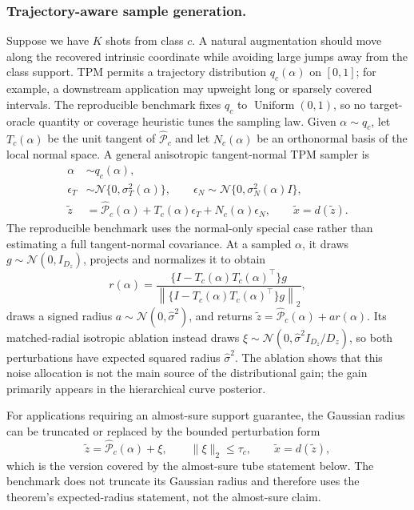 \documentclass[preprint,12pt,number]{elsarticle}
\begin{document}
\subsubsection{Trajectory-aware sample generation.} 
Suppose we have $K$ shots from class $c$. A natural augmentation should move along the recovered intrinsic coordinate while avoiding large jumps away from the class support. TPM permits a trajectory distribution $q_c(\alpha)$ on $[0,1]$; for example, a downstream application may upweight long or sparsely covered intervals. The reproducible benchmark fixes $q_c$ to $\operatorname{Uniform}(0,1)$, so no target-oracle quantity or coverage heuristic tunes the sampling law. Given $\alpha\sim q_c$, let $T_c(\alpha)$ be the unit tangent of $\widehat{\mathcal{P}}_c$ and let $N_c(\alpha)$ be an orthonormal basis of the local normal space. A general anisotropic tangent-normal TPM sampler is
\begin{align}
	\alpha &\sim q_c(\alpha), \nonumber\\
	\epsilon_T &\sim \mathcal{N}\{0,\sigma_T^2(\alpha)\}, \qquad
	\epsilon_N \sim \mathcal{N}\{0,\sigma_N^2(\alpha)I\}, \nonumber\\
	\tilde z
	&=
	\widehat{\mathcal{P}}_c(\alpha)
	+
	T_c(\alpha)\epsilon_T
	+
	N_c(\alpha)\epsilon_N,
	\qquad
	\tilde x=d(\tilde z).
	\label{eq:anisotropic_tpm_sampler}
\end{align}
The reproducible benchmark uses the normal-only special case rather than estimating a full tangent-normal covariance. At a sampled $\alpha$, it draws $g\sim\mathcal N(0,I_{D_z})$, projects and normalizes it to obtain
\[
	r(\alpha)
	=
	\frac{\{I-T_c(\alpha)T_c(\alpha)^\top\}g}
	{\left\lVert\{I-T_c(\alpha)T_c(\alpha)^\top\}g\right\rVert_2},
\]
draws a signed radius $a\sim\mathcal N(0,\widehat\sigma^2)$, and returns $\tilde z=\widehat{\mathcal P}_c(\alpha)+a r(\alpha)$. Its matched-radial isotropic ablation instead draws $\xi\sim\mathcal N(0,\widehat\sigma^2 I_{D_z}/D_z)$, so both perturbations have expected squared radius $\widehat\sigma^2$. The ablation shows that this noise allocation is not the main source of the distributional gain; the gain primarily appears in the hierarchical curve posterior.

For applications requiring an almost-sure support guarantee, the Gaussian radius can be truncated or replaced by the bounded perturbation form
\[
	\tilde z=\widehat{\mathcal{P}}_c(\alpha)+\xi,
	\qquad
	\lVert \xi\rVert_2\le\tau_c,
	\qquad
	\tilde x=d(\tilde z),
\]
which is the version covered by the almost-sure tube statement below. The benchmark does not truncate its Gaussian radius and therefore uses the theorem's expected-radius statement, not the almost-sure claim.
\end{document}
